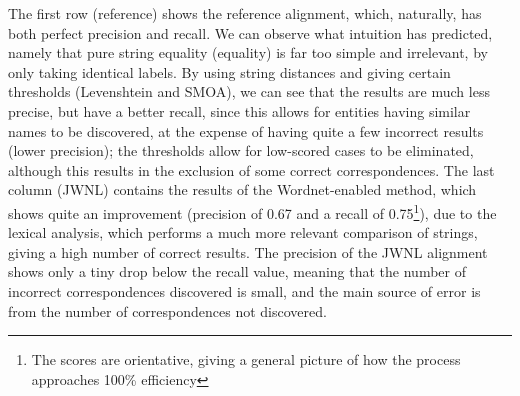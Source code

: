 The first row (reference) shows the reference alignment, which, naturally, has both perfect precision and recall. We can observe what intuition has predicted, namely that pure string equality (equality) is far too simple and irrelevant, by only taking identical labels. By using string distances and giving certain thresholds (Levenshtein and SMOA), we can see that the results are much less precise, but have a better recall, since this allows for entities having similar names to be discovered, at the expense of having quite a few incorrect results (lower precision); the thresholds allow for low-scored cases to be eliminated, although this results in the exclusion of some correct correspondences. The last column (JWNL) contains the results of the Wordnet-enabled method, which shows quite an improvement (precision of 0.67 and a recall of 0.75\footnote{The scores are orientative, giving a general picture of how the process approaches 100\% efficiency}), due to the lexical analysis, which performs a much more relevant comparison of strings, giving a high number of correct results. The precision of the JWNL alignment shows only a tiny drop below the recall value, meaning that the number of incorrect correspondences discovered is small, and the main source of error is from the number of correspondences not discovered.


% 


